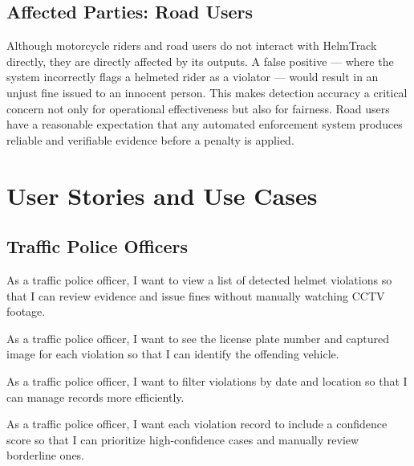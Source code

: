 \subsection{Affected Parties: Road Users}
\begin{subsecbody}
Although motorcycle riders and road users do not interact with HelmTrack directly, they are directly affected by its outputs. A false positive — where the system incorrectly flags a helmeted rider as a violator — would result in an unjust fine issued to an innocent person. This makes detection accuracy a critical concern not only for operational effectiveness but also for fairness. Road users have a reasonable expectation that any automated enforcement system produces reliable and verifiable evidence before a penalty is applied.
\end{subsecbody}

\section{User Stories and Use Cases}
\label{section:user-stories-use-cases}

\subsection{Traffic Police Officers}
\begin{subsecbody}
\begin{description}[leftmargin=80pt, labelwidth=60pt, itemsep=4pt, parsep=0pt]
    \item[\textbf{US-P-01}] As a traffic police officer, I want to view a list of detected helmet violations so that I can review evidence and issue fines without manually watching CCTV footage.
    \item[\textbf{US-P-02}] As a traffic police officer, I want to see the license plate number and captured image for each violation so that I can identify the offending vehicle.
    \item[\textbf{US-P-03}] As a traffic police officer, I want to filter violations by date and location so that I can manage records more efficiently.
    \item[\textbf{US-P-04}] As a traffic police officer, I want each violation record to include a confidence score so that I can prioritize high-confidence cases and manually review borderline ones.
\end{description}
\end{subsecbody}

